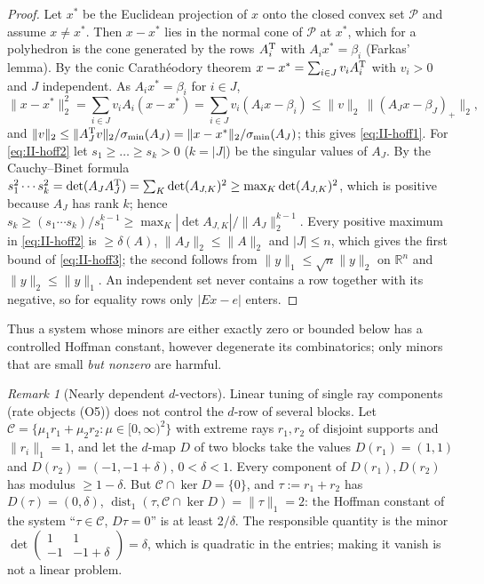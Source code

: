 \documentclass[10pt]{amsart}
\theoremstyle{definition}
\theoremstyle{remark}
\newtheorem{remark}[theorem]{Remark}
\newcommand{\dist}{\operatorname{dist}}
\newcommand{\R}{\mathbb R}
\begin{document}
\begin{proof}
Let $x^*$ be the Euclidean projection of $x$ onto the closed convex set
$\mathcal P$ and assume $x\ne x^*$.  Then $x-x^*$ lies in the normal cone of
$\mathcal P$ at $x^*$, which for a polyhedron is the cone generated by the
rows $A_i^{\rm T}$ with $A_ix^*=\beta_i$ (Farkas' lemma).  By the conic
Carath\'eodory theorem $x-x^*=\sum_{i\in J}v_iA_i^{\rm T}$ with $v_i>0$ and $J$
independent.  As $A_ix^*=\beta_i$ for $i\in J$,
\[
 \|x-x^*\|_2^2=\sum_{i\in J}v_iA_i(x-x^*)=\sum_{i\in J}v_i(A_ix-\beta_i)\le
 \|v\|_2\,\|(A_Jx-\beta_J)_+\|_2 ,
\]
and $\|v\|_2\le\|A_J^{\rm T}v\|_2/\sigma_{\min}(A_J)=\|x-x^*\|_2/
\sigma_{\min}(A_J)$; this gives \eqref{eq:II-hoff1}.  For \eqref{eq:II-hoff2}
let $s_1\ge\dots\ge s_k>0$ ($k=|J|$) be the singular values of $A_J$.  By the
Cauchy--Binet formula $s_1^2\cdots s_k^2=\det(A_JA_J^{\rm T})=\sum_K\det
(A_{J,K})^2\ge\max_K\det(A_{J,K})^2$, which is positive because $A_J$ has
rank $k$; hence $s_k\ge(s_1\cdots s_k)/s_1^{k-1}\ge\max_K|\det A_{J,K}|/
\|A_J\|_2^{k-1}$.  Every positive maximum in \eqref{eq:II-hoff2} is $\ge\delta
(A)$, $\|A_J\|_2\le\|A\|_2$ and $|J|\le n$, which gives the first bound of
\eqref{eq:II-hoff3}; the second follows from $\|y\|_1\le\sqrt n\|y\|_2$ on
$\R^n$ and $\|y\|_2\le\|y\|_1$.  An independent set never contains a row
together with its negative, so for equality rows only $|Ex-e|$ enters.
\end{proof}

Thus a system whose minors are either exactly zero or bounded below has a
controlled Hoffman constant, however degenerate its combinatorics; only
minors that are small \emph{but nonzero} are harmful.

\begin{remark}[Nearly dependent $d$-vectors]\label{rem:II-tworay}
Linear tuning of single ray components (rate objects (O5)) does not control
the $d$-row of several blocks.  Let $\mathcal C=\{\mu_1r_1+\mu_2r_2:\mu\in
[0,\infty)^2\}$ with extreme rays $r_1,r_2$ of disjoint supports and
$\|r_i\|_1=1$, and let the $d$-map $D$ of two blocks take the values
$D(r_1)=(1,1)$ and $D(r_2)=(-1,-1+\delta)$, $0<\delta<1$.  Every component
of $D(r_1),D(r_2)$ has modulus $\ge1-\delta$.  But $\mathcal C\cap\ker D=\{0\}$,
and $\tau:=r_1+r_2$ has $D(\tau)=(0,\delta)$, $\dist_1(\tau,\mathcal C\cap\ker
D)=\|\tau\|_1=2$: the Hoffman constant of the system ``$\tau\in\mathcal C$,
$D\tau=0$'' is at least $2/\delta$.  The responsible quantity is the minor
$\det\begin{pmatrix}1&1\\-1&-1+\delta\end{pmatrix}=\delta$, which is
quadratic in the entries; making it vanish is not a linear problem.
\end{remark}
\end{document}
